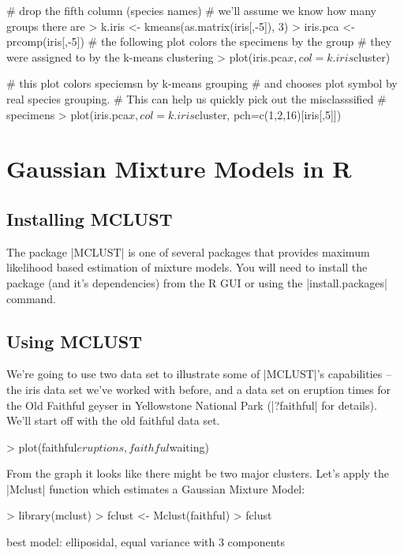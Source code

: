 \documentclass[10pt,letterpaper]{article}
\begin{document}
\begin{Code}
# drop the fifth column (species names)
# we'll assume we know how many groups there are    
> k.iris <- kmeans(as.matrix(iris[,-5]), 3)    
> iris.pca <- prcomp(iris[,-5])
# the following plot colors the specimens by the group
# they were assigned to by the k-means clustering
> plot(iris.pca$x,col=k.iris$cluster)

# this plot colors speciemsn by k-means grouping
# and chooses plot symbol by real species grouping.
# This can help us quickly pick out the misclasssified
# specimens
> plot(iris.pca$x, col=k.iris$cluster, pch=c(1,2,16)[iris[,5]])
\end{Code}


\section*{Gaussian Mixture Models in R}

\subsection*{Installing MCLUST}
The package |MCLUST| is one of several packages that provides maximum likelihood based estimation of mixture models.  You will need to install the package (and it's dependencies) from the R GUI or using the |install.packages| command.

\subsection*{Using MCLUST}

We're going to use two data set to illustrate some of |MCLUST|'s capabilities -- the iris data set we've worked with before, and a data set on eruption times for the Old Faithful geyser in Yellowstone National Park (|?faithful| for details). We'll start off with  the old faithful data set.
\begin{Code}
> plot(faithful$eruptions, faithful$waiting)    
\end{Code}

From the graph it looks like there might be two major clusters. Let's apply the |Mclust| function which estimates a Gaussian Mixture Model:

\begin{Code}
> library(mclust)
> fclust <- Mclust(faithful)
> fclust

 best model: elliposidal, equal variance with 3 components    
\end{Code}
\end{document}

